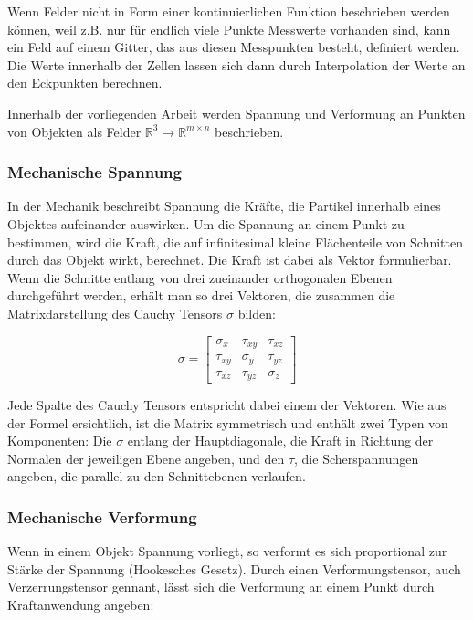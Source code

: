 \documentclass[a4paper,fontsize=12pt,toc=bib,parskip=half,ngerman]{scrartcl}
\begin{document}
Wenn Felder nicht in Form einer kontinuierlichen Funktion beschrieben werden k\"onnen, weil z.B. nur f\"ur endlich viele Punkte Messwerte vorhanden sind, kann ein Feld auf einem Gitter, das aus diesen Messpunkten besteht, definiert werden. Die Werte innerhalb der Zellen lassen sich dann durch Interpolation der Werte an den Eckpunkten berechnen.


Innerhalb der vorliegenden Arbeit werden Spannung und Verformung an Punkten von Objekten als Felder $\mathbb{R}^3 \rightarrow \mathbb{R}^{m\times n}$ beschrieben.


\subsubsection{Mechanische Spannung}
In der Mechanik beschreibt Spannung die Kr\"afte, die Partikel innerhalb eines Objektes aufeinander auswirken. Um die Spannung an einem Punkt zu bestimmen, wird die Kraft, die auf infinitesimal kleine Fl\"achenteile von Schnitten durch das Objekt wirkt, berechnet. Die Kraft ist dabei als Vektor formulierbar. Wenn die Schnitte entlang von drei zueinander orthogonalen Ebenen durchgef\"uhrt werden, erh\"alt man so drei Vektoren, die zusammen die Matrixdarstellung des Cauchy Tensors $\sigma$ bilden:

\begin{equation}
	\sigma =  
	\begin{bmatrix}
		\sigma_x & \tau_{xy} & \tau_{xz}\\
		\tau_{xy} & \sigma_y & \tau_{yz}\\
		\tau_{xz} & \tau_{yz} & \sigma_z
	\end{bmatrix}
\end{equation}

Jede Spalte des Cauchy Tensors entspricht dabei einem der Vektoren. Wie aus der Formel ersichtlich, ist die Matrix symmetrisch und enth\"alt zwei Typen von Komponenten: Die $\sigma$ entlang der Hauptdiagonale, die Kraft in Richtung der Normalen der jeweiligen Ebene angeben, und den $\tau$, die Scherspannungen angeben, die parallel zu den Schnittebenen verlaufen. 

\subsubsection{Mechanische Verformung}
Wenn in einem Objekt Spannung vorliegt, so verformt es sich proportional zur St\"arke der Spannung (Hookesches Gesetz). Durch einen Verformungstensor, auch Verzerrungstensor gennant, l\"asst sich die Verformung an einem Punkt durch Kraftanwendung angeben:
\end{document}
